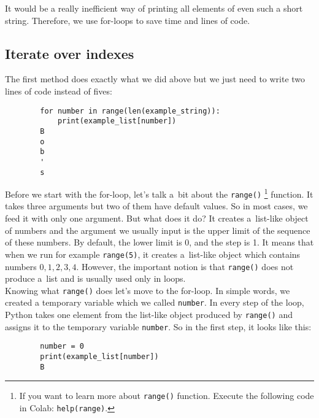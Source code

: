 \documentclass{article}
\begin{document}
\noindent It would be a really inefficient way of printing all elements of even such a short string. Therefore, we use for-loops to save time and lines of code.

\subsection*{Iterate over indexes}
The first method does exactly what we did above but we just need to write two lines of code instead of fives:
\begin{center}
    \begin{verbatim}
        for number in range(len(example_string)):
            print(example_list[number])
        B
        o
        b
        '
        s
    \end{verbatim}
\end{center}

\noindent Before we start with the for-loop, let's talk a~bit about the \texttt{range()} \footnote{If you want to learn more about \texttt{range()} function. Execute the following code in Colab: \texttt{help(range)}.} function. It takes three arguments but two of them have default values. So in most cases, we feed it with only one argument. But what does it do? It creates a~list-like object of numbers and the argument we usually input is the upper limit of the sequence of these numbers. By default, the lower limit is 0, and the step is 1. It means that when we run for example \texttt{range(5)}, it creates a~list-like object which contains numbers $0, 1, 2, 3, 4$. However, the important notion is that \texttt{range()} does not produce a~list and is usually used only in loops.\\

\noindent Knowing what \texttt{range()} does let's move to the for-loop. In simple words, we created a temporary variable which we called \texttt{number}. In every step of the loop, Python takes one element from the list-like object produced by \texttt{range()} and assigns it to the temporary variable \texttt{number}. So in the first step, it looks like this:

\begin{center}
    \begin{verbatim}
        number = 0
        print(example_list[number])
        B
    \end{verbatim}
\end{center}
\end{document}
